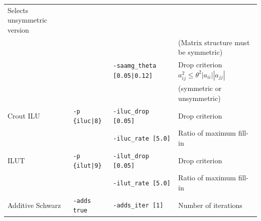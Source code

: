 \documentclass[a4paper]{article}
\begin{document}
\begin{minipage}[t]{\textwidth}
\begin{center}
\begin{tabular}{l|lll}
 Selects unsymmetric version    \\
         &                       &                             & (Matrix structure must be symmetric)    \\
         &                       & \verb=-saamg_theta [0.05|0.12]= & Drop criterion $a^2_{ij}\le\theta^2|a_{ii}||a_{jj}|$ \\
         &                       &                             & (symmetric or unsymmetric) \\
Crout ILU& \verb=-p {iluc|8}=    & \verb=-iluc_drop [0.05]=    & Drop criterion    \\
         &                       & \verb=-iluc_rate [5.0]=     & Ratio of maximum fill-in \\
ILUT     & \verb=-p {ilut|9}=    & \verb=-ilut_drop [0.05]=    & Drop criterion    \\
         &                       & \verb=-ilut_rate [5.0]=     & Ratio of maximum fill-in \\
Additive Schwarz  & \verb=-adds true=   &  \verb=-adds_iter [1]= & Number of iterations   \\
\hline         
\end{tabular}
\end{center}
\end{minipage}
\\ \\
\end{document}

